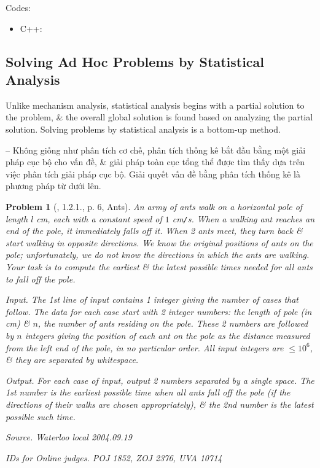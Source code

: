 \documentclass{article}
\newtheorem{problem}{Problem}
\begin{document}
Codes:
\begin{itemize}
	\item C++: 
\end{itemize}


\subsection{Solving Ad Hoc Problems by Statistical Analysis}
Unlike mechanism analysis, statistical analysis begins with a partial solution to the problem, \& the overall global solution is found based on analyzing the partial solution. Solving problems by statistical analysis is a bottom-up method.

-- Không giống như phân tích cơ chế, phân tích thống kê bắt đầu bằng một giải pháp cục bộ cho vấn đề, \& giải pháp toàn cục tổng thể được tìm thấy dựa trên việc phân tích giải pháp cục bộ. Giải quyết vấn đề bằng phân tích thống kê là phương pháp từ dưới lên.

\begin{problem}[\cite{Wu_Wang2018}, 1.2.1., p. 6, Ants]
	An army of ants walk on a horizontal pole of length $l$ {\rm cm}, each with a constant speed of $1$ {\rm cm{\tt/}s}. When a walking ant reaches an end of the pole, it immediately falls off it. When 2 ants meet, they turn back \& start walking in opposite directions. We know the original positions of ants on the pole; unfortunately, we do not know the directions in which the ants are walking. Your task is to compute the earliest \& the latest possible times needed for all ants to fall off the pole.
	\item {\sf Input.} The 1st line of input contains 1 integer giving the number of cases that follow. The data for each case start with 2 integer numbers: the length of pole (in {\rm cm}) \& $n$, the number of ants residing on the pole. These 2 numbers are followed by $n$ integers giving the position of each ant on the pole as the distance measured from the left end of the pole, in no particular order. All input integers are $\le10^6$, \& they are separated by whitespace.
	\item {\sf Output.} For each case of input, output 2 numbers separated by a single space. The 1st number is the earliest possible time when all ants fall off the pole (if the directions of their walks are chosen appropriately), \& the 2nd number is the latest possible such time.
	\item {\sf Source.} Waterloo local 2004.09.19
	\item {\sf IDs for Online judges.} POJ 1852, ZOJ 2376, UVA 10714
\end{problem}
\end{document}
